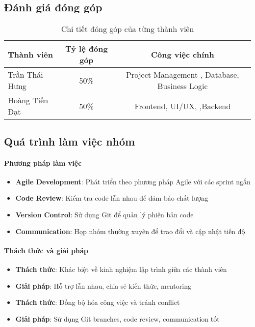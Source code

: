 \documentclass[12pt,a4paper]{article}
\begin{document}
 \subsection{Đánh giá đóng góp}

 \begin{table}[H]
 \centering
 \caption{Chi tiết đóng góp của từng thành viên}
 \label{tab:contribution_details}
 \begin{tabular}{|l|c|c|}
 \hline
 \textbf{Thành viên} & \textbf{Tỷ lệ đóng góp} & \textbf{Công việc chính} \\
 \hline
 Trần Thái Hưng & 50\% & Project Management , Database, Business Logic \\
 \hline
 Hoàng Tiến Đạt & 50\% & Frontend, UI/UX, ,Backend\\
 \hline
 \end{tabular}
 \end{table}

 \subsection{Quá trình làm việc nhóm}

 \paragraph{Phương pháp làm việc}
 \begin{itemize}
     \item \textbf{Agile Development}: Phát triển theo phương pháp Agile với các sprint ngắn
     \item \textbf{Code Review}: Kiểm tra code lẫn nhau để đảm bảo chất lượng
     \item \textbf{Version Control}: Sử dụng Git để quản lý phiên bản code
     \item \textbf{Communication}: Họp nhóm thường xuyên để trao đổi và cập nhật tiến độ
 \end{itemize}

 \paragraph{Thách thức và giải pháp}
 \begin{itemize}
     \item \textbf{Thách thức}: Khác biệt về kinh nghiệm lập trình giữa các thành viên
     \item \textbf{Giải pháp}: Hỗ trợ lẫn nhau, chia sẻ kiến thức, mentoring
     \item \textbf{Thách thức}: Đồng bộ hóa công việc và tránh conflict
     \item \textbf{Giải pháp}: Sử dụng Git branches, code review, communication tốt
 \end{itemize}
\end{document}
